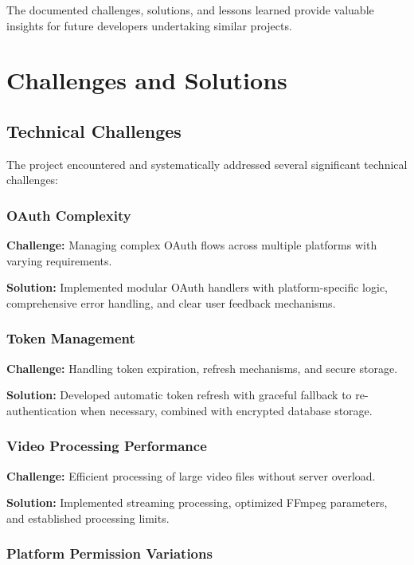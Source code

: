 The documented challenges, solutions, and lessons learned provide valuable insights for future developers undertaking similar projects.

\section{Challenges and Solutions}

\subsection{Technical Challenges}

The project encountered and systematically addressed several significant technical challenges:

\subsubsection{OAuth Complexity}

\textbf{Challenge:} Managing complex OAuth flows across multiple platforms with varying requirements.

\textbf{Solution:} Implemented modular OAuth handlers with platform-specific logic, comprehensive error handling, and clear user feedback mechanisms.

\subsubsection{Token Management}

\textbf{Challenge:} Handling token expiration, refresh mechanisms, and secure storage.

\textbf{Solution:} Developed automatic token refresh with graceful fallback to re-authentication when necessary, combined with encrypted database storage.

\subsubsection{Video Processing Performance}

\textbf{Challenge:} Efficient processing of large video files without server overload.

\textbf{Solution:} Implemented streaming processing, optimized FFmpeg parameters, and established processing limits.

\subsubsection{Platform Permission Variations}

